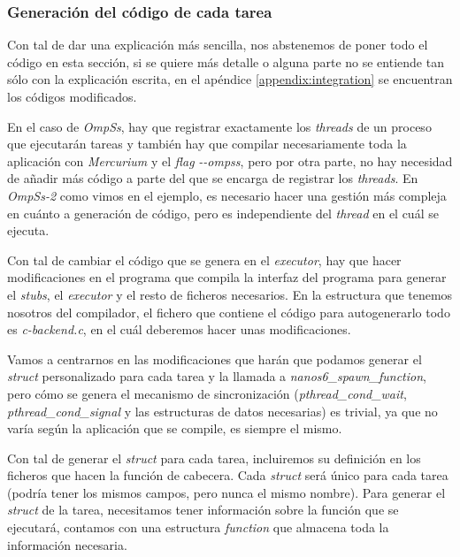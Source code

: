 \subsubsection{Generación del código de cada tarea}

Con tal de dar una explicación más sencilla, nos abstenemos de poner todo el código en esta sección, si se quiere más detalle o alguna parte no se entiende tan sólo con la explicación escrita, en el apéndice \ref{appendix:integration} se encuentran los códigos modificados. 
\par\bigskip
En el caso de \textit{OmpSs}, hay que registrar exactamente los \textit{threads} de un proceso que ejecutarán tareas y también hay que compilar necesariamente toda la aplicación con \textit{Mercurium} y el \textit{flag} \textit{-{}-ompss}, pero por otra parte, no hay necesidad de añadir más código a parte del que se encarga de registrar los \textit{threads}. En \textit{OmpSs-2} como vimos en el ejemplo, es necesario hacer una gestión más compleja en cuánto a generación de código, pero es independiente del \textit{thread} en el cuál se ejecuta.
\par\bigskip
Con tal de cambiar el código que se genera en el \textit{executor}, hay que hacer modificaciones en el programa que compila la interfaz del programa para generar el \textit{stubs}, el \textit{executor} y el resto de ficheros necesarios. En la estructura que tenemos nosotros del compilador, el fichero que contiene el código para autogenerarlo todo es \textit{c-backend.c}, en el cuál deberemos hacer unas modificaciones.
\par\smallskip
Vamos a centrarnos en las modificaciones que harán que podamos generar el \textit{struct} personalizado para cada tarea y la llamada a \textit{nanos6\_spawn\_function}, pero cómo se genera el mecanismo de sincronización (\textit{pthread\_cond\_wait}, \textit{pthread\_cond\_signal} y las estructuras de datos necesarias) es trivial, ya que no varía según la aplicación que se compile, es siempre el mismo.
\par\bigskip
Con tal de generar el \textit{struct} para cada tarea, incluiremos su definición en los ficheros que hacen la función de cabecera. Cada \textit{struct} será único para cada tarea (podría tener los mismos campos, pero nunca el mismo nombre). Para generar el \textit{struct} de la tarea, necesitamos tener información sobre la función que se ejecutará, contamos con una estructura \textit{function} que almacena toda la información necesaria.
\bigskip

